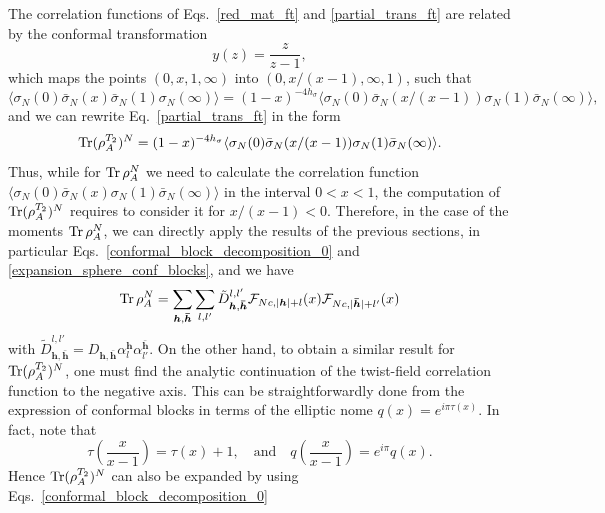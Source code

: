 \documentclass[a4paper,11pt]{article}
\def\Tr{\mathop{\mbox{\normalfont Tr}}\nolimits}
\begin{document}
The correlation functions of Eqs.~\eqref{red_mat_ft} and \eqref{partial_trans_ft} are
related by the conformal transformation
\begin{equation}
 y(z)=\frac{z}{z-1},
\end{equation}
which maps the points $(0, x, 1, \infty)$ into $(0, x/(x-1), \infty, 1)$, such that
\begin{equation}
 \langle \sigma_N(0)\bar{\sigma}_N(x)\bar{\sigma}_N(1)\sigma_N(\infty)\rangle=
 (1-x)^{-4h_\sigma}\langle \sigma_N(0)\bar{\sigma}_N(x/(x-1))\sigma_N(1)\bar{\sigma}_N(\infty)\rangle,
\end{equation}
and we can rewrite Eq.~\eqref{partial_trans_ft} in the form 
\begin{equation}\label{partial_trans_ft_2}
 \Tr(\rho_A^{T_2})^N=(1-x)^{-4h_\sigma}\langle \sigma_N(0)\bar{\sigma}_N(x/(x-1))\sigma_N(1)\bar{\sigma}_N(\infty)\rangle.
 \end{equation}
Thus, while for $\Tr\rho_A^N$ we need to calculate the correlation function 
$\langle\sigma_N(0)\bar{\sigma}_N(x)\sigma_N(1)\bar{\sigma}_N(\infty)\rangle$
in the interval $0<x<1$, the computation of $\Tr(\rho_A^{T_2})^N$ requires to consider it
for $x/(x-1)<0$. Therefore, in the case of the moments $\Tr\rho_A^N$, we can directly apply 
the results of the previous sections, in particular Eqs.~\eqref{conformal_block_decomposition_0}
and \eqref{expansion_sphere_conf_blocks}, and we have
\begin{equation}\label{red_mat_cb}
 \Tr\rho_A^N=\sum_{\boldsymbol{h}, \boldsymbol{\bar{h}}}\sum_{l, l'} 
 \tilde{D}_{\boldsymbol{h}, \boldsymbol{\bar{h}}}^{l, l'} 
 \mathcal{F}_{Nc, |\boldsymbol{h}|+l}(x)\mathcal{F}_{Nc, |\boldsymbol{\bar{h}}|+l'}(x)
\end{equation}
with $\tilde{D}_{\boldsymbol{h}, \boldsymbol{\bar{h}}}^{l, l'}=D_{\boldsymbol{h}, 
\boldsymbol{\bar{h}}}\alpha_l^{\boldsymbol{h}}\alpha_{l'}^{\boldsymbol{\bar{h}}}.$
On the other hand, to obtain a similar result for $\Tr(\rho_A^{T_2})^N$, 
one must find the analytic continuation of the twist-field correlation function to 
the negative axis. This can be straightforwardly done from the expression of conformal 
blocks in terms of the elliptic nome $q(x)=e^{i\pi \tau(x)}$. In fact, note that
\begin{equation}\label{tau_p_1}
 \tau\left(\frac{x}{x-1}\right)=\tau(x)+1, \quad \text{and} \quad 
 q\left(\frac{x}{x-1}\right)=e^{i\pi} q(x).
\end{equation}
Hence $\Tr(\rho_A^{T_2})^N$ can also be expanded by using Eqs.~\eqref{conformal_block_decomposition_0} 
\end{document}
